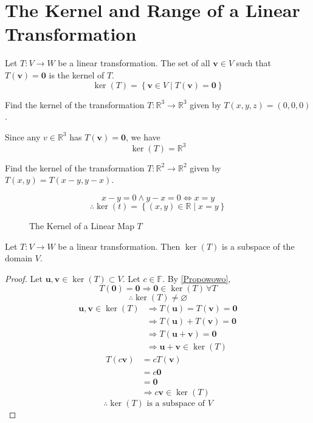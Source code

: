 \section{The Kernel and Range of a Linear Transformation}
\begin{definition}[Kernel]
    Let \(T:V\to W\) be a linear transformation. The set of all \(\mathbf{v}\in V\) such that \(T(\mathbf{v})=\mathbf{0}\) is the kernel of \(T\).
    \[
        \ker (T)=\left\{ \mathbf{v}\in V\mid T(\mathbf{v})=\mathbf{0} \right\} 
    \]
\end{definition}
\begin{exercise}
    Find the kernel of the transformation \(T:\mathbb{R}^3 \to \mathbb{R}^3\) given by \(T(x,y,z)=(0,0,0)\).
\end{exercise}
\begin{solution}
    Since any \(v\in\mathbb{R}^3\) has \(T(\mathbf{v})=\mathbf{0}\), we have 
    \[
        \ker (T)=\mathbb{R}^3
    \]
\end{solution}
\begin{exercise}
    Find the kernel of the transformation \(T:\mathbb{R}^2 \to \mathbb{R}^2\) given by \(T(x,y)=T(x-y,y-x)\).
\end{exercise}
\begin{solution}
    \[
        x-y=0\land y-x=0\iff x=y
    \]
    \[
        \therefore \ker (t)=\left\{ (x,y)\in\mathbb{R} \mid x=y \right\} 
    \]
\end{solution}
\begin{center}
    \begin{figure}[ht]
        \centering
        \caption{The Kernel of a Linear Map \(T\)}
    \end{figure}
\end{center}
\begin{theorem}
    Let \(T:V\to W\) be a linear transformation. Then \(\ker (T)\) is a subspace of the domain \(V\).
\end{theorem}
\begin{proof}
    Let \(\mathbf{u},\mathbf{v}\in \ker (T) \subset V\). Let \(c\in\mathbb{F}\). By \ref{Propowowo}, 
    \[
        T(\mathbf{0})=\mathbf{0}\Longrightarrow \mathbf{0}\in\ker (T)\,\forall T
    \]
    \[
        \therefore \ker (T)\neq \varnothing 
    \]
    \begin{align*}
        \mathbf{u},\mathbf{v}\in\ker (T)&\Longrightarrow T(\mathbf{u})=T(\mathbf{v})=\mathbf{0}\\
        &\Longrightarrow T(\mathbf{u})+T(\mathbf{v})=\mathbf{0}\\
        &\Longrightarrow T(\mathbf{u}+\mathbf{v})=\mathbf{0}\\
        &\Longrightarrow \mathbf{u}+\mathbf{v}\in\ker (T)
    \end{align*}
    \begin{align*}
        T(c \mathbf{v})&=cT(\mathbf{v})\\
        &=c \mathbf{0}\\
        &=\mathbf{0}\\
        &\Longrightarrow c\mathbf{v}\in\ker (T)
    \end{align*}
    \[
        \therefore \ker (T)\text{ is a subspace of }V 
    \]
\end{proof}
